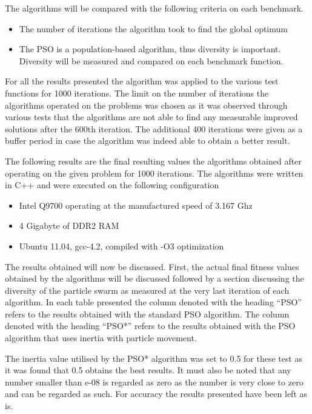 The algorithms will be compared with the following criteria on each benchmark.
\begin{itemize}
\item The number of iterations the algorithm took to find the global optimum
\item The PSO is a population-based algorithm, thus diversity is important. Diversity will be measured and compared on each benchmark function.
\end{itemize}
For all the results presented the algorithm was applied to the various test functions for 1000 iterations. The limit on the number of iterations the algorithms operated on the problems was chosen as it was observed through various tests that the algorithms are not able to find any measurable improved solutions after the 600th iteration. The additional 400 iterations were given as a buffer period in case the algorithm was indeed able to obtain a better result.

The following results are the final resulting values the algorithms obtained after operating on the given problem for 1000 iterations. The algorithms were written in C++ and were executed on the following configuration
\begin{itemize}
\item Intel Q9700 operating at the manufactured speed of 3.167 Ghz
\item 4 Gigabyte of DDR2 RAM
\item Ubuntu 11.04, gcc-4.2, compiled with -O3 optimization
\end{itemize}

The results obtained will now be discussed. First, the actual final fitness values obtained by the algorithms will be discussed followed by a section discussing the diversity of the particle swarm as measured at the very last iteration of each algorithm. In each table presented the column denoted with the heading ``PSO'' refers to the results obtained with the standard PSO algorithm. The column denoted with the heading ``PSO*'' refers to the results obtained with the PSO algorithm that uses inertia with particle movement. 

The inertia value utilised by the PSO* algorithm was set to 0.5 for these test as it was found that 0.5 obtains the best results. It must also be noted that any number smaller than e-08 is regarded as zero as the number is very close to zero and can be regarded as such. For accuracy the results presented have been left as is.
